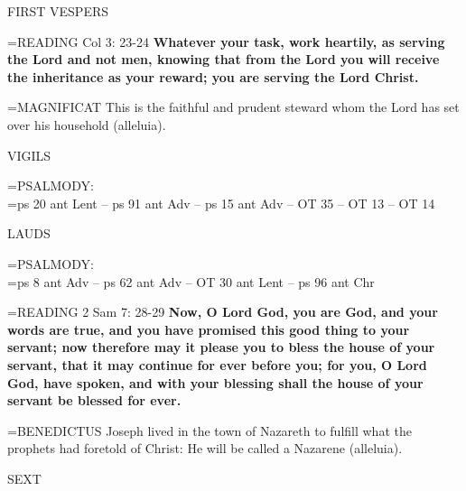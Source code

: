 \begin{flushleft}\normalsize FIRST VESPERS\\\end{flushleft}

\hangindent=\parindent \small{READING} Col 3: 23-24 \textbf{Whatever your task, work heartily, as serving
the Lord and not men, knowing that from the Lord you will receive
the inheritance as your reward; you are serving the Lord Christ.\\}
 
\hangindent=\parindent \small{MAGNIFICAT  This is the faithful and prudent steward whom the Lord
has set over his household (alleluia).\\}
 
\begin{flushleft}\normalsize VIGILS\\\end{flushleft}

\hangindent=\parindent \small{PSALMODY:}\\
\hangindent=\parindent  ps 20 ant Lent -- ps 91 ant Adv -- ps 15 ant Adv -- OT 35 -- OT 13 -- OT 14\vspace{0.5em}

\begin{flushleft}\normalsize LAUDS\\\end{flushleft}

\hangindent=\parindent \small{PSALMODY:}\\
\hangindent=\parindent  ps 8 ant Adv -- ps 62 ant Adv -- OT 30 ant Lent -- ps 96 ant Chr\vspace{0.5em}

\hangindent=\parindent \small{READING} 2 Sam 7: 28-29 \textbf{Now, O Lord God, you are God, and your
words are true, and you have promised this good thing to your
servant; now therefore may it please you to bless the house of your
servant, that it may continue for ever before you; for you, O Lord
God, have spoken, and with your blessing shall the house of your
servant be blessed for ever.\\}
 
\hangindent=\parindent \small{BENEDICTUS  Joseph lived in the town of Nazareth to fulfill what
the prophets had foretold of Christ: He will be called a Nazarene
(alleluia).\\}
 
\begin{flushleft}\normalsize SEXT\\\end{flushleft}

